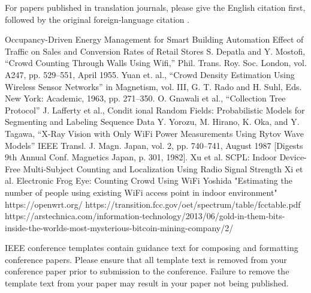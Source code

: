 \documentclass[conference]{IEEEtran}
\begin{document}
For papers published in translation journals, please give the English 
citation first, followed by the original foreign-language citation \cite{b6}.
\begin{thebibliography}{00}
 Occupancy-Driven Energy Management for Smart Building Automation
 Effect of Traffic on Sales and Conversion Rates of Retail Stores
 S. Depatla and Y. Mostofi, ``Crowd Counting Through Walls Using Wifi,'' Phil. Trans. Roy. Soc. London, vol. A247, pp. 529--551, April 1955.
 Yuan et. al., ``Crowd Density Estimation Using Wireless Sensor Networks'' in Magnetism, vol. III, G. T. Rado and H. Suhl, Eds. New York: Academic, 1963, pp. 271--350.
 O. Gnawali et al., ``Collection Tree Protocol''
 J. Lafferty et al., Condit
ional Random Fields: Probabilistic Models for Segmenting and Labeling Sequence Data
 Y. Yorozu, M. Hirano, K. Oka, and Y. Tagawa, ``X-Ray Vision with Only WiFi Power Measurements Using Rytov Wave Models'' IEEE Transl. J. Magn. Japan, vol. 2, pp. 740--741, August 1987 [Digests 9th Annual Conf. Magnetics Japan, p. 301, 1982].
 Xu et al. SCPL: Indoor Device-Free Multi-Subject Counting and Localization Using Radio Signal Strength
 Xi et al. Electronic Frog Eye: Counting Crowd Using WiFi
 Yoshida "Estimating the number of people using existing WiFi access point
in indoor environment"
 https://openwrt.org/
 https://transition.fcc.gov/oet/spectrum/table/fcctable.pdf
 https://arstechnica.com/information-technology/2013/06/gold-in-them-bits-inside-the-worlds-most-mysterious-bitcoin-mining-company/2/

\end{thebibliography}
\vspace{12pt}
\color{red}
IEEE conference templates contain guidance text for composing and formatting conference papers. Please ensure that all template text is removed from your conference paper prior to submission to the conference. Failure to remove the template text from your paper may result in your paper not being published.
\end{document}
